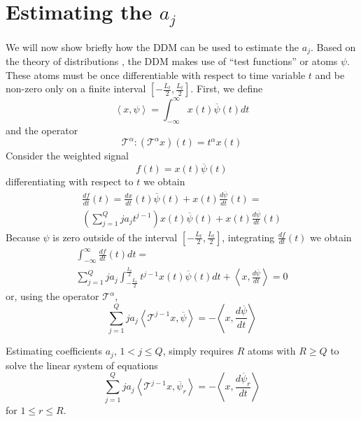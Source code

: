 \documentclass[twoside,a4paper]{article}
\begin{document}
\section{Estimating the \lowercase{$a_{j}$}}
\label{sec:estimating_aj}
We will now show briefly how the DDM can be used to estimate the $a_j$. Based on
the theory of distributions \cite{schwartz1959theorie}, the DDM
makes use of ``test
functions'' or atoms $\psi$. These atoms must be once differentiable with
respect to time variable $t$ and be non-zero only on a finite interval
$[-\frac{L_{t}}{2},\frac{L_{t}}{2}]$. First, we define
%
\begin{equation}
    \label{eq:ddm:inner:prod:def}
    \left\langle x , \psi \right\rangle = 
    \int_{-\infty}^{\infty}x(t)\overline{\psi}(t)dt
\end{equation}
%
and the operator 
%
\[
\mathcal{T}^{\alpha} : (\mathcal{T}^{\alpha}x)(t) = t^{\alpha}x(t)
\]
%
Consider the weighted signal
%
\[
    f(t) = x(t) \overline{\psi}(t)
\]
%
differentiating with respect to $t$ we obtain
%
\begin{multline}
    \label{eq:ddm:weighted:sig:derivative}
    \frac{df}{dt}(t) = 
    \frac{dx}{dt}(t)\overline{\psi}(t)
    + x(t)\frac{d\overline{\psi}}{dt}(t) = \\
    \left( \sum_{j=1}^{Q} j a_j t^{j-1} \right) x(t)\overline{\psi}(t)
    + x(t)\frac{d\overline{\psi}}{dt}(t)
\end{multline}
%
Because $\psi$ is zero outside of the interval $[-\frac{L_{t}}{2},\frac{L_{t}}{2}]$, integrating
$\frac{df}{dt}(t)$ we obtain
%
\begin{multline*}
    \int_{-\infty}^{\infty}\frac{df}{dt}(t)dt = \\
    \sum_{j=1}^{Q} j a_j \int_{-\frac{L_{t}}{2}}^{\frac{L_{t}}{2}} t^{j-1} x(t) \overline{\psi}(t) dt
    + \left\langle x, \frac{d\overline{\psi}}{dt} \right\rangle = 0
\end{multline*}
%
or, using the operator $\mathcal{T}^{\alpha}$,
%
\[ 
    \sum_{j=1}^{Q} j a_j 
    \left\langle \mathcal{T}^{j-1} x , \overline{\psi} \right\rangle
    = -\left\langle x, \frac{d\overline{\psi}}{dt} \right\rangle
\]
%

Estimating coefficients $a_j$, ${1 < j \leq Q}$,
simply requires $R$ atoms with $R \geq Q$ to solve the linear system of
equations
\begin{equation}
    \label{eq:ddmsyseq}
    \sum_{j=1}^{Q} j a_j 
    \left\langle \mathcal{T}^{j-1} x , \overline{\psi}_{r} \right\rangle
    = -\left\langle x, \frac{d\overline{\psi}_{r}}{dt} \right\rangle
\end{equation}
for $1 \leq r \leq R$.
\end{document}
